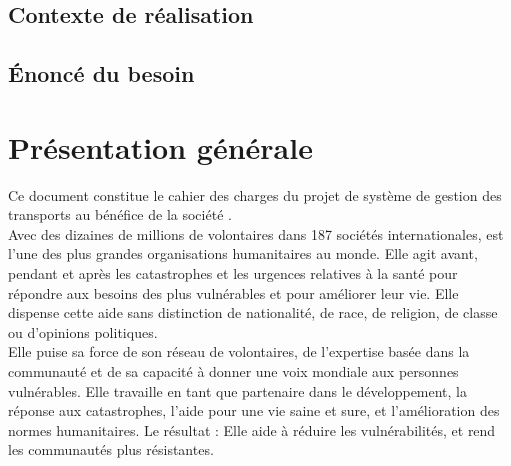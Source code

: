 \section{Contexte de réalisation}


\section{Énoncé du besoin}




\chapter{Présentation générale}
Ce document constitue le cahier des charges du projet de système de gestion des transports au bénéfice de la société \mo.
\\
Avec des dizaines de millions de volontaires dans 187 sociétés internationales, \mo est l'une des plus grandes organisations humanitaires au monde. Elle agit avant, pendant et après les catastrophes et les urgences relatives à la santé pour répondre aux besoins des plus vulnérables et pour améliorer leur vie. Elle dispense cette aide sans distinction de nationalité, de race, de religion, de classe ou d'opinions politiques.
\\
Elle puise sa force de son réseau de volontaires, de l'expertise basée dans la communauté et de sa capacité à donner une voix mondiale aux personnes vulnérables. Elle travaille en tant que partenaire dans le développement, la réponse aux catastrophes, l'aide pour une vie saine et sure, et l'amélioration des normes humanitaires. Le résultat : Elle aide à réduire les vulnérabilités, et rend les communautés plus résistantes.

